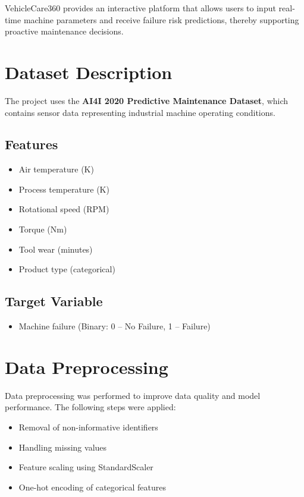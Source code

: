 \documentclass[12pt,a4paper]{article}
\begin{document}
VehicleCare360 provides an interactive platform that allows users to input real-time machine parameters and receive failure risk predictions, thereby supporting proactive maintenance decisions.

\section{Dataset Description}
The project uses the \textbf{AI4I 2020 Predictive Maintenance Dataset}, which contains sensor data representing industrial machine operating conditions.

\subsection{Features}
\begin{itemize}
    \item Air temperature (K)
    \item Process temperature (K)
    \item Rotational speed (RPM)
    \item Torque (Nm)
    \item Tool wear (minutes)
    \item Product type (categorical)
\end{itemize}

\subsection{Target Variable}
\begin{itemize}
    \item Machine failure (Binary: 0 – No Failure, 1 – Failure)
\end{itemize}

\section{Data Preprocessing}
Data preprocessing was performed to improve data quality and model performance. The following steps were applied:

\begin{itemize}
    \item Removal of non-informative identifiers
    \item Handling missing values
    \item Feature scaling using StandardScaler
    \item One-hot encoding of categorical features
\end{itemize}
\end{document}
